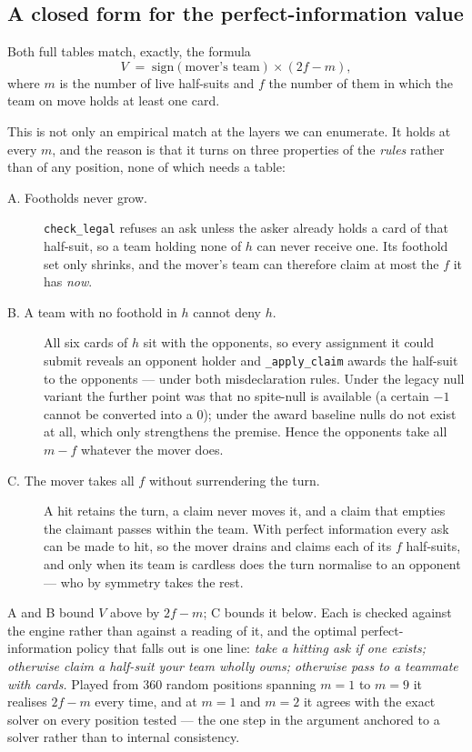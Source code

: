 \documentclass[11pt,letterpaper]{article}
\begin{document}
\subsection{A closed form for the perfect-information value}

Both full tables match, exactly, the formula
\begin{equation}
V \;=\; \mathrm{sign}(\text{mover's team}) \times (2f - m),
\label{eq:closedform}
\end{equation}
where $m$ is the number of live half-suits and $f$ the number of them in which
the team on move holds at least one card.

This is not only an empirical match at the layers we can enumerate. It holds at
every $m$, and the reason is that it turns on three properties of the
\emph{rules} rather than of any position, none of which needs a table:

\begin{description}
\item[A. Footholds never grow.] \texttt{check\_legal} refuses an ask unless the
asker already holds a card of that half-suit, so a team holding none of $h$ can
never receive one. Its foothold set only shrinks, and the mover's team can
therefore claim at most the $f$ it has \emph{now}.
\item[B. A team with no foothold in $h$ cannot deny $h$.] All six cards of $h$
sit with the opponents, so every assignment it could submit reveals an opponent
holder and \texttt{\_apply\_claim} awards the half-suit to the opponents ---
under both misdeclaration rules. Under the legacy null variant the further
point was that no spite-null is available (a certain $-1$ cannot be
converted into a $0$); under the award baseline nulls do not exist at all,
which only strengthens the premise. Hence the opponents take all $m - f$
whatever the mover does.
\item[C. The mover takes all $f$ without surrendering the turn.] A hit retains
the turn, a claim never moves it, and a claim that empties the claimant passes
within the team. With perfect information every ask can be made to hit, so the
mover drains and claims each of its $f$ half-suits, and only when its team is
cardless does the turn normalise to an opponent --- who by symmetry takes the
rest.
\end{description}

A and B bound $V$ above by $2f - m$; C bounds it below. Each is checked against
the engine rather than against a reading of it, and the optimal
perfect-information policy that falls out is one line: \emph{take a hitting ask
if one exists; otherwise claim a half-suit your team wholly owns; otherwise pass
to a teammate with cards.} Played from $360$ random positions spanning $m = 1$
to $m = 9$ it realises $2f - m$ every time, and at $m = 1$ and $m = 2$ it agrees
with the exact solver on every position tested --- the one step in the argument
anchored to a solver rather than to internal consistency.
\end{document}
